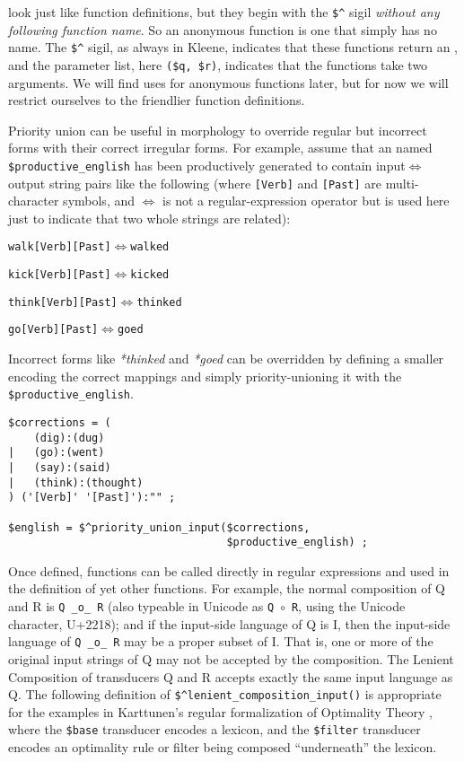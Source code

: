 \noindent
look just like function definitions, but they begin with the \verb!$^! sigil \emph{without any
following function name}. So an anonymous function is one that simply has no name.  The \verb!$^! sigil, as always in Kleene,
indicates that these functions return an \fsm{}, and the
parameter list, here \verb!($q, $r)!, indicates that the functions take two \fsm{} arguments.  We will find
uses for anonymous functions later, but for now we will restrict ourselves to the friendlier function
definitions.

Priority union can be useful in morphology to override regular but incorrect
forms with their correct irregular forms.  For example, assume that
an \fsm{} named \verb!$productive_english! has been productively generated to contain
input$\Longleftrightarrow$output
string pairs like the following (where \verb![Verb]! and \verb![Past]! are
multi-character symbols, and $\Longleftrightarrow$ is not a regular-expression
operator but is used here just to indicate that two whole strings are related):

\begin{alltt}
walk[Verb][Past] \(\Longleftrightarrow\) walked

kick[Verb][Past] \(\Longleftrightarrow\) kicked

think[Verb][Past] \(\Longleftrightarrow\) thinked

go[Verb][Past] \(\Longleftrightarrow\) goed
\end{alltt}

\noindent
Incorrect forms like \emph{*thinked} and \emph{*goed} can be overridden by 
defining a
smaller \fsm{} encoding the correct mappings and simply priority-unioning it with
the \fsm{} \verb!$productive_english!.

\begin{Verbatim}
$corrections = (
    (dig):(dug)
|   (go):(went)
|   (say):(said)
|   (think):(thought)
) ('[Verb]' '[Past]'):"" ;

$english = $^priority_union_input($corrections, 
                                  $productive_english) ;
\end{Verbatim}


Once defined, functions can be called directly in regular
expressions and used in the definition of yet other functions.  For
example, the normal composition of Q and R 
is \verb!Q _o_ R! (also typeable in Unicode as \verb!Q!~$\circ$~\verb!R!, using the
Unicode  character, U+2218); and if the input-side language of Q is I, then
the input-side language of \verb!Q _o_ R! may be a proper subset of I.
That is, one or more of the original input strings of Q may not be accepted by the 
composition.  The Lenient Composition of transducers Q and R accepts exactly the 
same input language as Q.  The
following definition of \verb!$^lenient_composition_input()! is
appropriate for the examples in Karttunen's regular formalization of Optimality Theory
\citep{karttunen:1998}, where the \verb!$base!
transducer encodes a lexicon, and the \verb!$filter! transducer
encodes an optimality rule or filter being composed
``underneath''
the lexicon.

